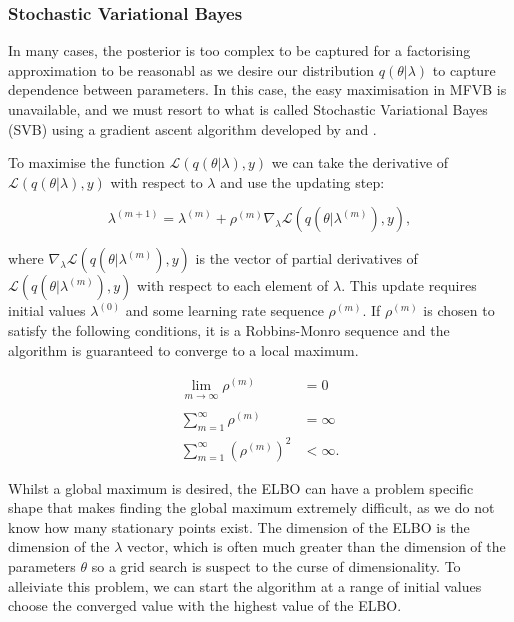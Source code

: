 \documentclass{article}\usepackage[]{graphicx}\usepackage[]{color}
\numberwithin{equation}{section}
\begin{document}
\subsubsection{Stochastic Variational Bayes}

In many cases, the posterior is too complex to be captured for a factorising approximation to be reasonabl as we desire our distribution $q(\theta | \lambda)$ to capture dependence between parameters. In this case, the easy maximisation in MFVB is unavailable, and we must resort to what is called Stochastic Variational Bayes (SVB) using a gradient ascent algorithm developed by \citet{Paisley2012} and \citet{Ranganash2014}.

To maximise the function $\mathcal{L}(q(\theta | \lambda), y)$ we can take the derivative of $\mathcal{L}(q(\theta | \lambda), y)$ with respect to $\lambda$ and use the updating step:

\begin{equation}
\label{SGA1}
\lambda^{(m+1)} = \lambda^{(m)} + \rho^{(m)} \nabla_{\lambda} \mathcal{L}(q(\theta | \lambda^{(m)}), y),
\end{equation}

where $\nabla_{\lambda}\mathcal{L}(q(\theta | \lambda^{(m)}), y)$ is the vector of partial derivatives of $\mathcal{L}(q(\theta | \lambda^{(m)}), y)$ with respect to each element of $\lambda$. This update requires initial values $\lambda^{(0)}$ and some learning rate sequence $\rho^{(m)}$. If $\rho^{(m)}$ is chosen to satisfy the following conditions, it is a Robbins-Monro sequence and the algorithm is guaranteed to converge to a local maximum.

\begin{align}
\lim_{m \xrightarrow[]{} \infty} \rho^{(m)} &= 0 \nonumber \\
\sum_{m=1}^{\infty} \rho^{(m)} &=  \infty \nonumber \\
\sum_{m=1}^{\infty} (\rho^{(m)})^2 &<  \infty. \nonumber
\end{align}

Whilst a global maximum is desired, the ELBO can have a problem specific shape that makes finding the global maximum extremely difficult, as we do not know how many stationary points exist. The dimension of the ELBO is the dimension of the $\lambda$ vector, which is often much greater than the dimension of the parameters $\theta$ so a grid search is suspect to the curse of dimensionality. To alleiviate this problem, we can start the algorithm at a range of initial values choose the converged value with the highest value of the ELBO. 
\end{document}
